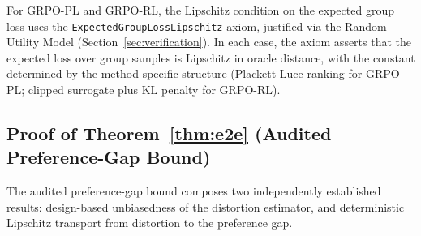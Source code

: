 For GRPO-PL and GRPO-RL, the Lipschitz condition on the expected group loss uses the \texttt{ExpectedGroupLossLipschitz} axiom, justified via the Random Utility Model (Section~\ref{sec:verification}). In each case, the axiom asserts that the expected loss over group samples is Lipschitz in oracle distance, with the constant determined by the method-specific structure (Plackett-Luce ranking for GRPO-PL; clipped surrogate plus KL penalty for GRPO-RL).

\subsection{Proof of Theorem~\ref{thm:e2e} (Audited Preference-Gap Bound)}\label{app:proof-e2e}

The audited preference-gap bound composes two independently established results: design-based unbiasedness of the distortion estimator, and deterministic Lipschitz transport from distortion to the preference gap.


